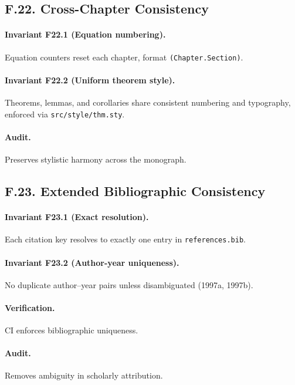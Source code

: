 \subsection*{F.22. Cross-Chapter Consistency}

\paragraph{Invariant F22.1 (Equation numbering).}
Equation counters reset each chapter, format \texttt{(Chapter.Section)}.

\paragraph{Invariant F22.2 (Uniform theorem style).}
Theorems, lemmas, and corollaries share consistent numbering and
typography, enforced via \texttt{src/style/thm.sty}.

\paragraph{Audit.}
Preserves stylistic harmony across the monograph.

\subsection*{F.23. Extended Bibliographic Consistency}

\paragraph{Invariant F23.1 (Exact resolution).}
Each citation key resolves to exactly one entry in
\texttt{references.bib}.

\paragraph{Invariant F23.2 (Author-year uniqueness).}
No duplicate author–year pairs unless disambiguated (1997a, 1997b).

\paragraph{Verification.}
CI enforces bibliographic uniqueness.

\paragraph{Audit.}
Removes ambiguity in scholarly attribution.

